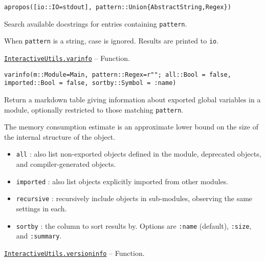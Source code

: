 \begin{adjustwidth}{2em}{0pt}


\begin{verbatim}
apropos([io::IO=stdout], pattern::Union{AbstractString,Regex})
\end{verbatim}

Search available docstrings for entries containing \texttt{pattern}.

When \texttt{pattern} is a string, case is ignored. Results are printed to \texttt{io}.



\end{adjustwidth}
\hypertarget{18269429703422902914}{}
\hyperlink{18269429703422902914}{\texttt{InteractiveUtils.varinfo}}  -- {Function.}

\begin{adjustwidth}{2em}{0pt}


\begin{verbatim}
varinfo(m::Module=Main, pattern::Regex=r""; all::Bool = false, imported::Bool = false, sortby::Symbol = :name)
\end{verbatim}

Return a markdown table giving information about exported global variables in a module, optionally restricted to those matching \texttt{pattern}.

The memory consumption estimate is an approximate lower bound on the size of the internal structure of the object.

\begin{itemize}
\item \texttt{all} : also list non-exported objects defined in the module, deprecated objects, and compiler-generated objects.


\item \texttt{imported} : also list objects explicitly imported from other modules.


\item \texttt{recursive} : recursively include objects in sub-modules, observing the same settings in each.


\item \texttt{sortby} : the column to sort results by. Options are \texttt{:name} (default), \texttt{:size}, and \texttt{:summary}.

\end{itemize}


\end{adjustwidth}
\hypertarget{11698106121547091928}{}
\hyperlink{11698106121547091928}{\texttt{InteractiveUtils.versioninfo}}  -- {Function.}

